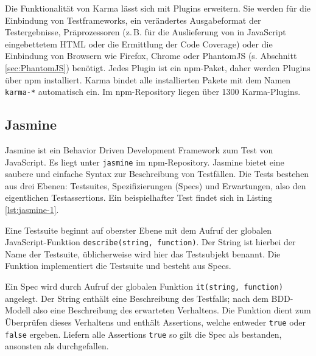 \begin{figure}[H]
	
\end{figure}

Die Funktionalität von Karma lässt sich mit Plugins erweitern. Sie werden für die Einbindung von Testframeworks, ein verändertes Ausgabeformat der Testergebnisse, Präprozessoren (z.\,B. für die Auslieferung von in JavaScript eingebettetem HTML oder die Ermittlung der Code Coverage)\cite{karma-preprocessors} oder die Einbindung von Browsern wie Firefox, Chrome oder PhantomJS (s. Abschnitt \ref{sec:PhantomJS}) benötigt. Jedes Plugin ist ein npm-Paket, daher werden Plugins über npm installiert. Karma bindet alle installierten Pakete mit dem Namen \texttt{karma-*} automatisch ein.\cite{karma-plugins} Im npm-Repository liegen über 1300 Karma-Plugins.\cite{karma-npm}

\subsection{Jasmine}
\label{sec:Jasmine}
Jasmine ist ein Behavior Driven Development Framework zum Test von JavaScript\cite{jasmine-introduction}. Es liegt unter \texttt{jasmine} im npm-Repository\cite{jasmine-getting-started}. Jasmine bietet eine saubere und einfache Syntax zur Beschreibung von Testfällen. Die Tests bestehen aus drei Ebenen: Testsuites, Spezifizierungen (\glqq Specs\grqq) und Erwartungen, also den eigentlichen Testassertions\cite{jasmine-introduction}. Ein beispielhafter Test findet sich in Listing \ref{lst:jasmine-1}.

Eine Testsuite beginnt auf oberster Ebene mit dem Aufruf der globalen JavaScript-Funktion \texttt{describe(string, function)}. Der String ist hierbei der Name der Testsuite, üblicherweise wird hier das Testsubjekt benannt. Die Funktion implementiert die Testsuite und besteht aus Specs.\cite{jasmine-introduction}

Ein Spec wird durch Aufruf der globalen Funktion \texttt{it(string, function)} angelegt. Der String enthält eine Beschreibung des Testfalls; nach dem BDD-Modell also eine Beschreibung des erwarteten Verhaltens. Die Funktion dient zum Überprüfen dieses Verhaltens und enthält Assertions, welche entweder \texttt{true} oder \texttt{false} ergeben. Liefern alle Assertions \texttt{true} so gilt die Spec als bestanden, ansonsten als durchgefallen.\cite{jasmine-introduction}

